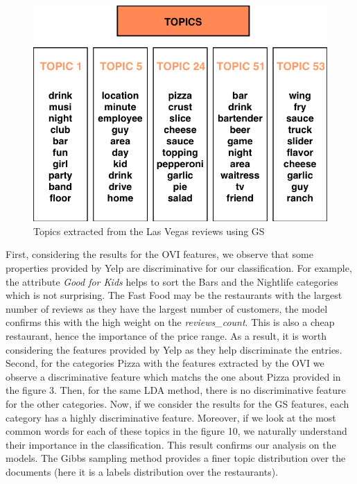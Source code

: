\documentclass[twoside]{article}
\begin{document}
\begin{multicols}{2}
\begin{figure}[H]
\centering
\includegraphics[width=1\linewidth]{img/gs_topics.png}
\caption{Topics extracted from the Las Vegas reviews using GS}
\end{figure}

First, considering the results for the OVI features, we observe that some properties provided by Yelp are discriminative for our classification. For example, the attribute \textit{Good for Kids} helps to sort the Bars and the Nightlife categories which is not surprising. The Fast Food may be the restaurants with the largest number of reviews as they have the largest number of customers, the model confirms this with the high weight on the \textit{reviews\_count}. This is also a cheap restaurant, hence the importance of the price range. As a result, it is worth considering the features provided by Yelp as they help discriminate the entries.\\

Second, for the categories Pizza with the features extracted by the OVI we observe a discriminative feature which matchs the one about Pizza provided in the figure 3. Then, for the same LDA method, there is no discriminative feature for the other categories. Now, if we consider the results for the GS features, each category has a highly discriminative feature. Moreover, if we look at the most common words for each of these topics in the figure 10, we naturally understand their importance in the classification. This result confirms our analysis on the models. The Gibbs sampling method provides a finer topic distribution over the documents (here it is a labels distribution over the restaurants).


\end{multicols}
\end{document}
